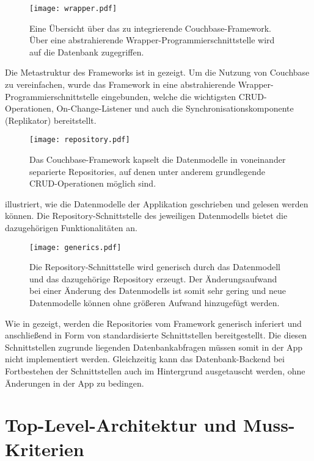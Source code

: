 \begin{figure}[H]
\texttt{[image: wrapper.pdf]}
\caption{Eine Übersicht über das zu integrierende Couchbase-Framework. Über eine abstrahierende Wrapper-Programmierschnittstelle wird auf die Datenbank zugegriffen.}\label{fig:wrapper}
\end{figure}

\noindent Die Metastruktur des Frameworks ist in  gezeigt. Um die Nutzung von Couchbase zu vereinfachen, wurde das Framework in eine abstrahierende Wrapper-Programmierschnittstelle eingebunden, welche die wichtigsten CRUD-Operationen, On-Change-Listener und auch die Synchronisationskomponente (Replikator) bereitstellt.

\begin{figure}[H]
\texttt{[image: repository.pdf]}
\caption{Das Couchbase-Framework kapselt die Datenmodelle in voneinander separierte Repositories, auf denen unter anderem grundlegende CRUD-Operationen möglich sind.}\label{fig:repository}
\end{figure}

\noindent {} illustriert, wie die Datenmodelle der Applikation geschrieben und gelesen werden können. Die Repository-Schnittstelle des jeweiligen Datenmodells bietet die dazugehörigen Funktionalitäten an.

\begin{figure}[H]
\texttt{[image: generics.pdf]}
\caption{Die Repository-Schnittstelle wird generisch durch das Datenmodell und das dazugehörige Repository erzeugt. Der Änderungsaufwand bei einer Änderung des Datenmodells ist somit sehr gering und neue Datenmodelle können ohne größeren Aufwand hinzugefügt werden.}\label{fig:generics}
\end{figure}

\noindent Wie in  gezeigt, werden die Repositories vom Framework generisch inferiert und anschließend in Form von standardisierte Schnittstellen bereitgestellt. Die diesen Schnittstellen zugrunde liegenden Datenbankabfragen müssen somit in der App nicht implementiert werden. Gleichzeitig kann das Datenbank-Backend bei Fortbestehen der Schnittstellen auch im Hintergrund ausgetauscht werden, ohne Änderungen in der App zu bedingen.

\section{Top-Level-Architektur und Muss-Kriterien}

